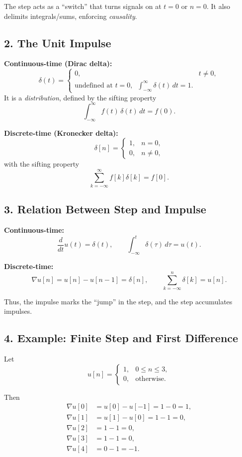 \documentclass[12pt,a4paper]{article}
\begin{document}
		The step acts as a ``switch'' that turns signals on at $t=0$ or $n=0$.  
		It also delimits integrals/sums, enforcing \emph{causality}.
		
			
		\subsection*{2. The Unit Impulse}
		
		\textbf{Continuous-time (Dirac delta):}
		$$
		\delta(t) =
		\begin{cases}
			0, & t \neq 0, \\
			\text{undefined at } t=0, \;\; \int_{-\infty}^\infty \delta(t)\,dt = 1.
		\end{cases}
		$$
		It is a \emph{distribution}, defined by the sifting property
		$$
		\int_{-\infty}^{\infty} f(t)\,\delta(t)\,dt = f(0).
		$$
		
		\textbf{Discrete-time (Kronecker delta):}
		$$
		\delta[n] =
		\begin{cases}
			1, & n=0, \\
			0, & n \neq 0,
		\end{cases}
		$$
		with the sifting property
		$$
		\sum_{k=-\infty}^\infty f[k]\delta[k] = f[0].
		$$
		
			
		\subsection*{3. Relation Between Step and Impulse}
		
		\textbf{Continuous-time:}
		$$
		\frac{d}{dt}u(t) = \delta(t), 
		\qquad
		\int_{-\infty}^{t} \delta(\tau)\, d\tau = u(t).
		$$
		
		\textbf{Discrete-time:}
		$$
		\nabla u[n] = u[n] - u[n-1] = \delta[n],
		\qquad
		\sum_{k=-\infty}^{n} \delta[k] = u[n].
		$$
		
		Thus, the impulse marks the ``jump'' in the step, and the step accumulates impulses.
		
			
		\subsection*{4. Example: Finite Step and First Difference}
		
		Let
		$$
		u[n] =
		\begin{cases}
			1, & 0 \leq n \leq 3, \\
			0, & \text{otherwise}.
		\end{cases}
		$$
		
		Then
		\begin{align*}
			\nabla u[0] &= u[0]-u[-1] = 1-0 = 1, \\
			\nabla u[1] &= u[1]-u[0] = 1-1 = 0, \\
			\nabla u[2] &= 1-1=0, \\
			\nabla u[3] &= 1-1=0, \\
			\nabla u[4] &= 0-1=-1.
		\end{align*}
		
\end{document}

